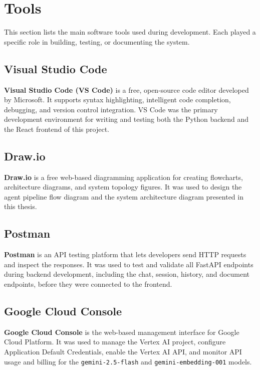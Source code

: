 \section{Tools}

\hs This section lists the main software tools used during development. Each played a
specific role in building, testing, or documenting the system.

\subsection{Visual Studio Code}
\textbf{Visual Studio Code (VS Code)} is a free, open-source code editor developed by
Microsoft. It supports syntax highlighting, intelligent code completion, debugging, and
version control integration. VS Code was the primary development environment for writing
and testing both the Python backend and the React frontend of this project.

\subsection{Draw.io}
\textbf{Draw.io} is a free web-based diagramming application for creating flowcharts,
architecture diagrams, and system topology figures. It was used to design the agent
pipeline flow diagram and the system architecture diagram presented in this thesis.

\subsection{Postman}
\textbf{Postman} is an API testing platform that lets developers send HTTP requests and
inspect the responses. It was used to test and validate all FastAPI endpoints during
backend development, including the chat, session, history, and document endpoints, before
they were connected to the frontend.

\subsection{Google Cloud Console}
\textbf{Google Cloud Console} is the web-based management interface for Google Cloud
Platform. It was used to manage the Vertex AI project, configure Application Default
Credentials, enable the Vertex AI API, and monitor API usage and billing for the
\texttt{gemini-2.5-flash} and \texttt{gemini-embedding-001} models.

